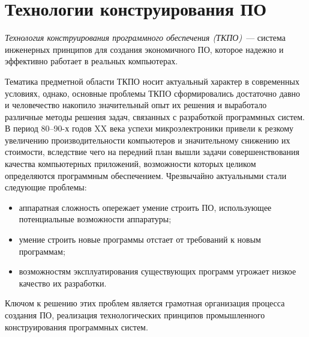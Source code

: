 \section{Технологии конструирования ПО}

{\em Технология конструирования программного обеспечения (ТКПО)}~--- 
система инженерных принципов для создания экономичного ПО, 
которое надежно и эффективно работает в реальных компьютерах.

Тематика предметной области ТКПО носит актуальный характер 
в современных условиях, однако, основные проблемы ТКПО 
сформировались достаточно давно и человечество накопило 
значительный опыт их решения и выработало различные методы 
решения задач, связанных с разработкой программных систем.
В период 80--90-х годов XX века успехи микроэлектроники 
привели к резкому увеличению производительности компьютеров 
и значительному снижению их стоимости, вследствие чего 
на передний план вышли задачи совершенствования качества 
компьютерных приложений, возможности которых целиком 
определяются программным обеспечением. Чрезвычайно актуальными 
стали следующие проблемы:

\begin{itemize}
  \item аппаратная сложность опережает умение строить ПО, 
использующее потенциальные возможности аппаратуры;
  \item умение строить новые программы отстает от требований 
к новым программам;
  \item возможностям эксплуатирования существующих программ 
угрожает низкое качество их разработки.
\end{itemize}

Ключом к решению этих проблем является грамотная организация процесса 
создания ПО, реализация технологических принципов промышленного 
конструирования программных систем.




